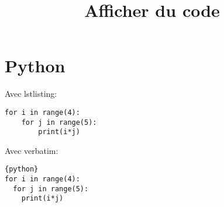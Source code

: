 \documentclass[a4paper,11pt]{article}
\begin{document}
\title{Afficher du code}
\date{}
\maketitle

\section{Python}

\lstset{language=Python}

% 

Avec lstlisting:\par
\begin{lstlisting}
for i in range(4):
    for j in range(5):
        print(i*j)
\end{lstlisting}


Avec verbatim:\par
\begin{verbatim}{python}
for i in range(4):
  for j in range(5):
    print(i*j)
\end{verbatim}
\end{document}
